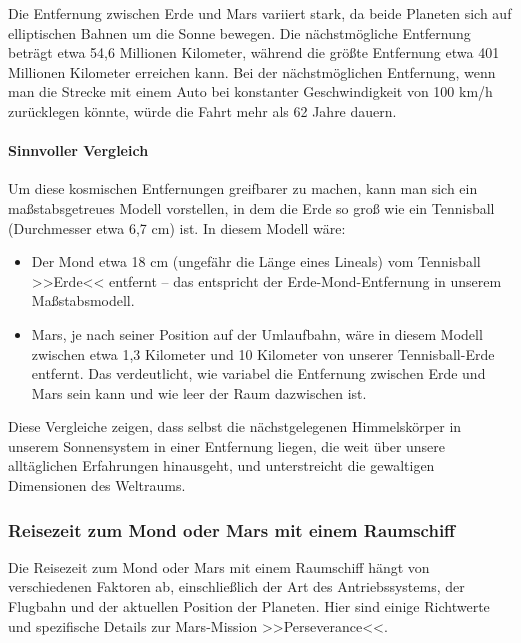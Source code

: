 \documentclass{vorlage-design-main}
\begin{document}
Die Entfernung zwischen Erde und Mars variiert stark, da beide Planeten
sich auf elliptischen Bahnen um die Sonne bewegen. Die nächstmögliche
Entfernung beträgt etwa 54,6 Millionen Kilometer, während die größte
Entfernung etwa 401 Millionen Kilometer erreichen kann. Bei der
nächstmöglichen Entfernung, wenn man die Strecke mit einem Auto bei
konstanter Geschwindigkeit von 100 km/h zurücklegen könnte, würde die
Fahrt mehr als 62 Jahre dauern.

\hypertarget{sinnvoller-vergleich}{%
\paragraph{Sinnvoller Vergleich}\label{sinnvoller-vergleich}}

Um diese kosmischen Entfernungen greifbarer zu machen, kann man sich ein
maßstabsgetreues Modell vorstellen, in dem die Erde so groß wie ein
Tennisball (Durchmesser etwa 6,7 cm) ist. In diesem Modell wäre:

\begin{itemize}

\item
  Der Mond etwa 18 cm (ungefähr die Länge eines Lineals) vom Tennisball
  >>Erde<< entfernt -- das entspricht der Erde-Mond-Entfernung in
  unserem Maßstabsmodell.
\item
  Mars, je nach seiner Position auf der Umlaufbahn, wäre in diesem
  Modell zwischen etwa 1,3 Kilometer und 10 Kilometer von unserer
  Tennisball-Erde entfernt. Das verdeutlicht, wie variabel die
  Entfernung zwischen Erde und Mars sein kann und wie leer der Raum
  dazwischen ist.
\end{itemize}

Diese Vergleiche zeigen, dass selbst die nächstgelegenen Himmelskörper
in unserem Sonnensystem in einer Entfernung liegen, die weit über unsere
alltäglichen Erfahrungen hinausgeht, und unterstreicht die gewaltigen
Dimensionen des Weltraums.

\hypertarget{reisezeit-zum-mond-oder-mars-mit-einem-raumschiff}{%
\subsubsection{Reisezeit zum Mond oder Mars mit einem
Raumschiff}\label{reisezeit-zum-mond-oder-mars-mit-einem-raumschiff}}

Die Reisezeit zum Mond oder Mars mit einem Raumschiff hängt von
verschiedenen Faktoren ab, einschließlich der Art des Antriebssystems,
der Flugbahn und der aktuellen Position der Planeten. Hier sind einige
Richtwerte und spezifische Details zur Mars-Mission >>Perseverance<<.
\end{document}
